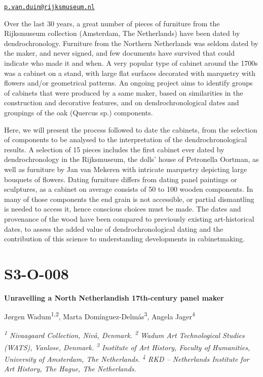\documentclass[
]{book}
\begin{document}
\href{mailto:p.van.duin@rijksmuseum.nl}{\nolinkurl{p.van.duin@rijksmuseum.nl}}

Over the last 30 years, a great number of pieces of furniture from the Rijksmuseum collection (Amsterdam, The Netherlands) have been dated by dendrochronology. Furniture from the Northern Netherlands was seldom dated by the maker, and never signed, and few documents have survived that could indicate who made it and when. A very popular type of cabinet around the 1700s was a cabinet on a stand, with large flat surfaces decorated with marquetry with flowers and/or geometrical patterns. An ongoing project aims to identify groups of cabinets that were produced by a same maker, based on similarities in the construction and decorative features, and on dendrochronological dates and groupings of the oak (Quercus sp.) components.

Here, we will present the process followed to date the cabinets, from the selection of components to be analysed to the interpretation of the dendrochronological results. A selection of 15 pieces includes the first cabinet ever dated by dendrochronology in the Rijksmuseum, the dolls' house of Petronella Oortman, as well as furniture by Jan van Mekeren with intricate marquetry depicting large bouquets of flowers. Dating furniture differs from dating panel paintings or sculptures, as a cabinet on average consists of 50 to 100 wooden components. In many of those components the end grain is not accessible, or partial dismantling is needed to access it, hence conscious choices must be made. The dates and provenance of the wood have been compared to previously existing art-historical dates, to assess the added value of dendrochronological dating and the contribution of this science to understanding developments in cabinetmaking.

\hypertarget{s3-o-008}{%
\section*{S3-O-008}\label{s3-o-008}}

\textbf{Unravelling a North Netherlandish 17th-century panel maker}

Jørgen Wadum\textsuperscript{1,2}, Marta Domínguez-Delmás\textsuperscript{3}, Angela Jager\textsuperscript{4}

\emph{\textsuperscript{1} Nivaagaard Collection, Nivå, Denmark. \textsuperscript{2} Wadum Art Technological Studies (WATS), Vanlose, Denmark. \textsuperscript{3} Institute of Art History, Faculty of Humanities, University of Amsterdam, The Netherlands. \textsuperscript{4} RKD -- Netherlands Institute for Art History, The Hague, The Netherlands.}
\end{document}
